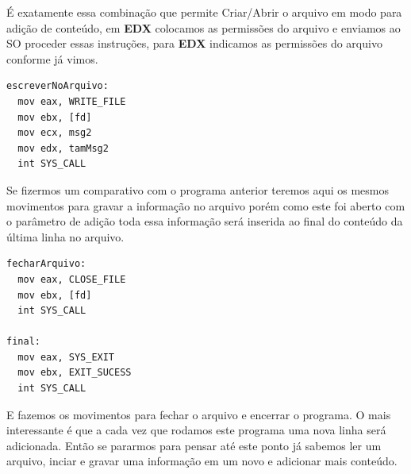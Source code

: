 É exatamente essa combinação que permite Criar/Abrir o arquivo em modo para adição de conteúdo, em \textbf{EDX} colocamos as permissões do arquivo e enviamos ao SO proceder essas instruções, para \textbf{EDX} indicamos as permissões do arquivo conforme já vimos.

\begin{lstlisting}[]
escreverNoArquivo:
  mov eax, WRITE_FILE
  mov ebx, [fd]
  mov ecx, msg2
  mov edx, tamMsg2
  int SYS_CALL 	
\end{lstlisting}	

Se fizermos um comparativo com o programa anterior teremos aqui os mesmos movimentos para gravar a informação no arquivo porém como este foi aberto com o parâmetro de adição toda essa informação será inserida ao final do conteúdo da última linha no arquivo.

\begin{lstlisting}[]
fecharArquivo:
  mov eax, CLOSE_FILE
  mov ebx, [fd]
  int SYS_CALL    

final:
  mov eax, SYS_EXIT
  mov ebx, EXIT_SUCESS
  int SYS_CALL 	
\end{lstlisting}	

E fazemos os movimentos para fechar o arquivo e encerrar o programa. O mais interessante é que a cada vez que rodamos este programa uma nova linha será adicionada. Então se pararmos para pensar até este ponto já sabemos ler um arquivo, inciar e gravar uma informação em um novo e adicionar mais conteúdo.

\clearpage